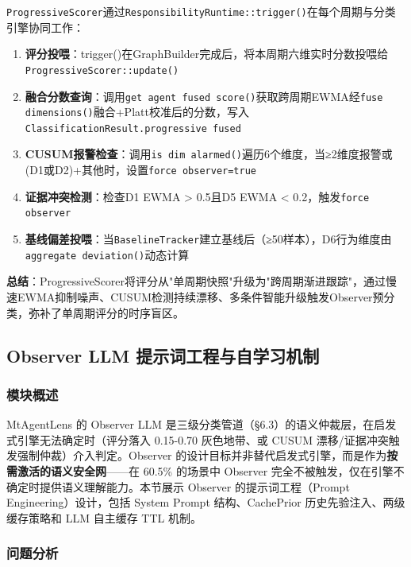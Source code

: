 \documentclass[a4paper]{ctexart}
\makeatletter
\renewcommand{\_}{%
  \ifmmode
    \nfss@text{\textunderscore}%
  \else
    \textunderscore\discretionary{}{}{}%
  \fi}
\makeatother
\begin{document}
\texttt{ProgressiveScorer}通过\texttt{ResponsibilityRuntime::trigger()}在每个周期与分类引擎协同工作：


\begin{enumerate}
\item \textbf{评分投喂}：trigger()在GraphBuilder完成后，将本周期六维实时分数投喂给\texttt{ProgressiveScorer::\allowbreak update()}
\item \textbf{融合分数查询}：调用\texttt{get\_agent\_fused\_score()}获取跨周期EWMA经\texttt{fuse\_dimensions()}融合+Platt校准后的分数，写入\texttt{ClassificationResult.\allowbreak progressive\_fused}
\item \textbf{CUSUM报警检查}：调用\texttt{is\_dim\_alarmed()}遍历6个维度，当≥2维度报警或(D1或D2)+其他时，设置\texttt{force\_observer=true}
\item \textbf{证据冲突检测}：检查D1 EWMA > 0.5且D5 EWMA < 0.2，触发\texttt{force\_observer}
\item \textbf{基线偏差投喂}：当\texttt{BaselineTracker}建立基线后（≥50样本），D6行为维度由\texttt{aggregate\_deviation()}动态计算
\end{enumerate}

\textbf{总结}：ProgressiveScorer将评分从"单周期快照"升级为"跨周期渐进跟踪"，通过慢速EWMA抑制噪声、CUSUM检测持续漂移、多条件智能升级触发Observer预分类，弥补了单周期评分的时序盲区。


\subsection{Observer LLM 提示词工程与自学习机制}



\subsubsection{模块概述}



MtAgentLens 的 Observer LLM 是三级分类管道（§6.3）的语义仲裁层，在启发式引擎无法确定时（评分落入 0.15-0.70 灰色地带、或 CUSUM 漂移/证据冲突触发强制仲裁）介入判定。Observer 的设计目标并非替代启发式引擎，而是作为\textbf{按需激活的语义安全网}——在 60.5\% 的场景中 Observer 完全不被触发，仅在引擎不确定时提供语义理解能力。本节展示 Observer 的提示词工程（Prompt Engineering）设计，包括 System Prompt 结构、CachePrior 历史先验注入、两级缓存策略和 LLM 自主缓存 TTL 机制。


\subsubsection{问题分析}
\end{document}
